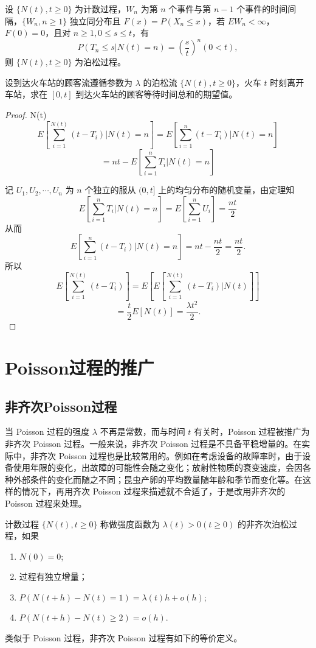 \documentclass[lang=cn,10pt,thmcnt=section]{elegantbook}
\begin{document}
\begin{theorem}
	设 $\{N(t), t \geq 0\}$ 为计数过程，$W_n$ 为第 $n$ 个事件与第 $n-1$ 个事件的时间间隔，$\{W_n, n \geq 1\}$ 独立同分布且 $F(x) = P(X_n \leq x)$，若 $EW_n < \infty$，$F(0) = 0$，且对 $n \geq 1, 0 \leq s \leq t$，有
\[
P(T_n \leq s | N(t) = n) = \left(\frac{s}{t}\right)^n (0 < t),
\]
则 $\{N(t), t \geq 0\}$ 为泊松过程。
\end{theorem}

\begin{example}
	设到达火车站的顾客流遵循参数为 $\lambda$ 的泊松流 $\{N(t), t \geq 0\}$，火车 $t$ 时刻离开车站，求在 $[0,t]$ 到达火车站的顾客等待时间总和的期望值。
\end{example}
\begin{proof}
	 N(t) 
\[
E\left[\sum_{i=1}^{N(t)} (t - T_i) | N(t) = n\right] = E\left[\sum_{i=1}^{n} (t - T_i) | N(t) = n\right]
\]
\[
= nt - E\left[\sum_{i=1}^{n} T_i | N(t) = n\right]
\]

记 $U_1, U_2, \cdots, U_n$ 为 $n$ 个独立的服从 $(0,t]$ 上的均匀分布的随机变量，由定理知
\[
E\left[\sum_{i=1}^{n} T_i | N(t) = n\right] = E\left[\sum_{i=1}^{n} U_i\right] = \frac{nt}{2}
\]
从而
\[
E\left[\sum_{i=1}^{n} (t - T_i) | N(t) = n\right] = nt - \frac{nt}{2} = \frac{nt}{2}.
\]
所以
\[
E\left[\sum_{i=1}^{N(t)} (t - T_i)\right] = E\left[E\left[\sum_{i=1}^{N(t)} (t - T_i) | N(t)\right]\right]
\]
\[
= \frac{t}{2} E[N(t)] = \frac{\lambda t^2}{2}.
\]
\end{proof}





\section{Poisson过程的推广}

\subsection{非齐次Poisson过程}
当 Poisson 过程的强度 $\lambda$ 不再是常数，而与时间 $t$ 有关时，Poisson 过程被推广为非齐次 Poisson 过程。一般来说，非齐次 Poisson 过程是不具备平稳增量的。在实际中，非齐次 Poisson 过程也是比较常用的。例如在考虑设备的故障率时，由于设备使用年限的变化，出故障的可能性会随之变化；放射性物质的衰变速度，会因各种外部条件的变化而随之不同；昆虫产卵的平均数量随年龄和季节而变化等。在这样的情况下，再用齐次 Poisson 过程来描述就不合适了，于是改用非齐次的 Poisson 过程来处理。

\begin{definition}
	计数过程 $\{N(t), t \geq 0\}$ 称做强度函数为 $\lambda(t) > 0 (t \geq 0)$ 的非齐次泊松过程，如果
\begin{enumerate}
    \item $N(0) = 0$;
    \item 过程有独立增量；
    \item $P(N(t+h) - N(t) = 1) = \lambda(t)h + o(h)$;
    \item $P(N(t+h) - N(t) \geq 2) = o(h)$.
\end{enumerate}
\end{definition}
类似于 Poisson 过程，非齐次 Poisson 过程有如下的等价定义。
\end{document}
